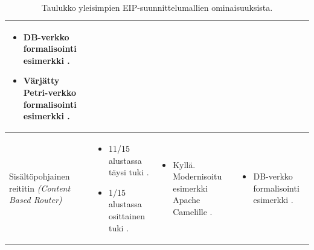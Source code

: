 \begin{table}[h]
\begin{tabular}{|p{}|p{}|p{}|p{}|}
\begin{itemize}
           \item DB-verkko formalisointi esimerkki \citep{Ritter2021}.
           \item Värjätty Petri-verkko formalisointi esimerkki \citep{Fahland2013}.
        \end{itemize}
      \\ \hline
    Sisältöpohjainen reititin \textit{(Content Based Router)} & 
        \begin{itemize}
            \item 11/15 alustassa täysi tuki \citep{Ritter2017}.
            \item 1/15 alustassa osittainen tuki \citep{Ritter2017}.
        \end{itemize}
      &
        \begin{itemize}
           \item Kyllä. Modernisoitu esimerkki Apache Camelille \citep{HohpeModernExamples}.
        \end{itemize}
      &
        \begin{itemize}
           \item DB-verkko formalisointi esimerkki \citep{Ritter2021}.
        \end{itemize}
      \\ \hline
    \end{tabular}
   \caption{Taulukko yleisimpien EIP-suunnittelumallien ominaisuuksista.}
   \label{table:eip1}
\end{table}



